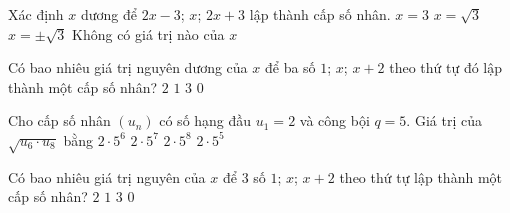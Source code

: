 

\begin{ex}%
	Xác  định $x$ dương để $2x-3$; $x$; $2x+3$ lập thành cấp số nhân.
	\choice 
		 {$x=3$}
		{\True  $x=\sqrt 3 $}
		{$x=\pm\sqrt  3 $}
		{Không có giá trị  nào của $x$}
\end{ex}

\begin{ex}%
	Có bao nhiêu giá trị nguyên dương của $x$ để ba số $1$; $x$; $x+2$ theo thứ tự đó lập thành một cấp  số nhân?
	 \choice
		{$2$} 
		{\True  $1$}
		 {$3$}
		{$0$} 
\end{ex}

\begin{ex}%
	Cho cấp số nhân $(u_n)$ có số  hạng đầu $u_1=2$ và công bội $q=5$. Giá trị của $\sqrt{u_6\cdot u_8}$ bằng
	 \choice
		{\True $2\cdot  5^6$}
		{$2\cdot 5^7$} 
		{$2\cdot 5^8$} 
		{$2\cdot 5^5$} 
\end{ex}

\begin{ex}%
	Có bao nhiêu giá trị nguyên của $x$ để $3$ số $1$; $x$; $x+2$ theo  thứ tự lập thành một cấp số nhân?
	\choice 
		{$2$} 
		{\True  $1$}
		 {$3$}
		 {$0$}
\end{ex}

